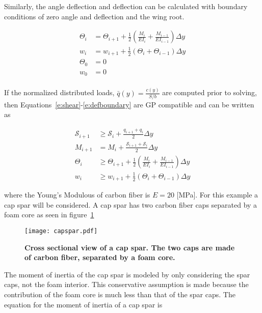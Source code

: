 \documentclass[]{aiaa-tc}%
\begin{document}
Similarly, the angle deflection and deflection can be calculated with boundary conditions of zero angle and deflection and the wing root.\cite{bending}

\begin{align}
    \label{e:angle}
    \Theta_{i} &= \Theta_{i+1} + \frac{1}{2} \left(\frac{M_i}{EI_i} + \frac{M_{i-1}}{EI_{i-1}} \right) \Delta y \\
    \label{e:deflection}
    w_{i} &= w_{i+1} + \frac{1}{2} (\Theta_i + \Theta_{i-1}) \Delta y \\
    \label{e:angleboundary}
    \Theta_0 &= 0 \\
    \label{e:defboundary}
    w_0 &= 0 \\
\end{align}
 
If the normalized distributed loads, $\bar{q}(y) = \frac{c(y)}{S/b}$ are computed prior to solving, then Equations~\ref{e:shear}-\ref{e:defboundary} are GP compatible and can be written as

\begin{align}
    \label{e:sheargp}
    \mathcal{S}_{i+1} &\geq \mathcal{S}_i + \frac{q_{i+1} + q_i}{2} \Delta y \\
    \label{e:momentgp}
    M_{i+1} &= M_i + \frac{\mathcal{S}_{i+1} + \mathcal{S}_i}{2} \Delta y \\
    \label{e:anglegp}
    \Theta_{i} &\geq \Theta_{i+1} + \frac{1}{2} \left(\frac{M_i}{EI_i} + \frac{M_{i-1}}{EI_{i-1}} \right) \Delta y \\
    \label{e:deflection}
    w_{i} &\geq w_{i+1} + \frac{1}{2} (\Theta_i + \Theta_{i-1}) \Delta y 
\end{align}

where the Young's Modulous of carbon fiber is $E = 20$ [MPa]. 
For this example a cap spar will be considered.  A cap spar has two carbon fiber caps separated by a foam core as seen in figure~\ref{f:capspar}

\begin{figure}[H]
	\begin{center}
	\texttt{[image: capspar.pdf]}
    \caption{ \textbf{ Cross sectional view of a cap spar.  The two caps are made of carbon fiber, separated by a foam core.}}
	\label{f:capspar}
	\end{center}
\end{figure}

The moment of inertia of the cap spar is modeled by only considering the spar caps, not the foam interior.  
This conservative assumption is made because the contribution of the foam core is much less than that of the spar caps.  
The equation for the moment of inertia\cite{bending} of a cap spar is 
\end{document}
